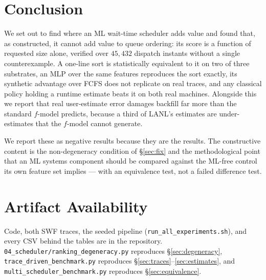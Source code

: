 \documentclass[11pt,twocolumn]{article}
\begin{document}
\section{Conclusion}

We set out to find where an ML wait-time scheduler adds value and found that,
as constructed, it cannot add value to queue ordering: its score is a function
of requested size alone, verified over $45{,}432$ dispatch instants without a
single counterexample. A one-line sort is statistically equivalent to it on two
of three substrates, an MLP over the same features reproduces the sort exactly,
its synthetic advantage over FCFS does not replicate on real traces, and any
classical policy holding a runtime estimate beats it on both real machines.
Alongside this we report that real user-estimate error damages backfill far more
than the standard $f$-model predicts, because a third of LANL's estimates are
under-estimates that the $f$-model cannot generate.

We report these as negative results because they are the results. The
constructive content is the non-degeneracy condition of \S\ref{sec:fix} and the
methodological point that an ML systems component should be compared against the
ML-free control its own feature set implies --- with an equivalence test, not a
failed difference test.

\section*{Artifact Availability}
Code, both SWF traces, the seeded pipeline
(\texttt{run\_all\_experiments.sh}), and every CSV behind the tables are in the
repository. \texttt{04\_scheduler/ranking\_degeneracy.py} reproduces
\S\ref{sec:degeneracy}, \texttt{trace\_driven\_benchmark.py} reproduces
\S\ref{sec:traces}--\ref{sec:estimates}, and
\texttt{multi\_scheduler\_benchmark.py} reproduces \S\ref{sec:equivalence}.
\end{document}
